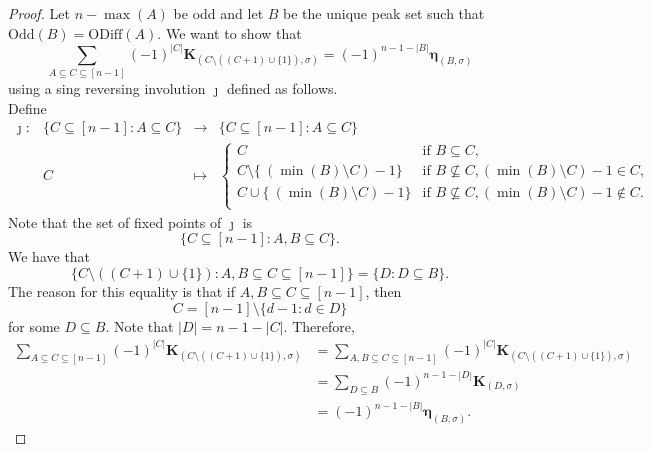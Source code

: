 \documentclass[11pt]{amsart}
\numberwithin{equation}{section}
\newcommand{\odd}{\mathrm{Odd}}
\newcommand{\oddd}{\mathrm{ODiff}}
\newcommand{\boldeta}{{\boldsymbol{\eta}}}
\begin{document}
\begin{proof}
Let $n-\max(A)$ be odd and let $B$ be the unique peak set such that $\odd(B)=\oddd(A)$. We want to show that 
$$\sum_{A\subseteq C\subseteq[n-1]}(-1)^{|C|}\mathbf{K}_{(C\setminus((C+1)\cup\{1\}),\sigma)}=(-1)^{n-1-|B|}\boldeta_{(B,\sigma)}$$ using a sing reversing involution $\jmath$ defined as follows. \\

Define 
$$
\begin{array}{cccc}
\jmath:& \{C\subseteq [n-1]: A\subseteq C\} & \rightarrow& \{C\subseteq [n-1]: A\subseteq C\}\\
& C & \mapsto & 
\begin{cases} 
C & \text{if~}B\subseteq C,\\
 C\setminus\{\ (\min(B)\setminus C)-1 \} & \text{if~}  B\not\subseteq C, (\min(B)\setminus C)-1\in C,\\
 C\cup\{\ (\min(B)\setminus C)-1 \}  & \text{if~}  B\not\subseteq C, (\min(B)\setminus C)-1\not\in C.\\
\end{cases} 
\end{array} 
$$
Note that the set of fixed points of $\jmath$ is 
$$\{C\subseteq [n-1]: A,B\subseteq C\}.$$ 
We have that
$$\{C\setminus ( (C+1)\cup \{1\} ): A,B\subseteq C\subseteq [n-1]\}=\{ D: D\subseteq B \}.$$
The reason for this equality is that if $A,B\subseteq C\subseteq [n-1]$, then 
$$C=[n-1]\setminus \{d-1:d\in D\}$$ for some $D\subseteq B$.
Note that  $|D|=n-1-|C|$. 
Therefore, 
\begin{align*} 
\sum_{A\subseteq C\subseteq[n-1]}(-1)^{|C|}\mathbf{K}_{(C\setminus((C+1)\cup\{1\}),\sigma)}&=\sum_{A,B\subseteq C\subseteq[n-1]}(-1)^{|C|}\mathbf{K}_{(C\setminus((C+1)\cup\{1\}),\sigma)}\\
&=\sum_{D\subseteq B}(-1)^{n-1-|D|}\mathbf{K}_{(D,\sigma)}\\
&=(-1)^{n-1-|B|}\boldeta_{(B,\sigma)}.
\end{align*}

\end{proof} 


%	
%	
%	
	
	
	
	
	
	
	
	
\end{document}
